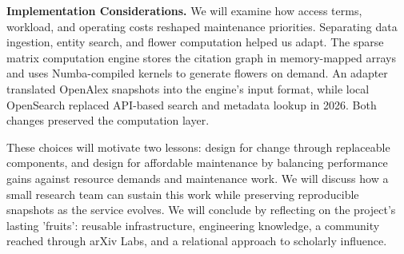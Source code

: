 \documentclass[]{hdsr}
\begin{document}


\textbf{Implementation Considerations.}
We will examine how access terms, workload, and operating costs reshaped maintenance priorities. Separating data ingestion, entity search, and flower computation helped us adapt. The sparse matrix computation engine stores the citation graph in memory-mapped arrays and uses Numba-compiled kernels to generate flowers on demand. An adapter translated OpenAlex snapshots into the engine's input format, while local OpenSearch replaced API-based search and metadata lookup in 2026. Both changes preserved the computation layer.

These choices will motivate two lessons: design for change through replaceable components, and design for affordable maintenance by balancing performance gains against resource demands and maintenance work. We will discuss how a small research team can sustain this work while preserving reproducible snapshots as the service evolves. We will conclude by reflecting on the project's lasting 'fruits': reusable infrastructure, engineering knowledge, a community reached through arXiv Labs, and a relational approach to scholarly influence.



\end{document}

